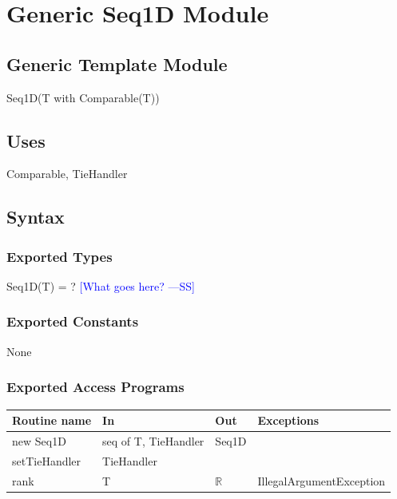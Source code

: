 \documentclass[12pt,fleqn]{examtst}
\newcommand{\authornote}[3]{\textcolor{#1}{[#3 ---#2]}}
\newcommand{\authornote}[3]{}
\newcommand{\wss}[1]{\authornote{blue}{SS}{#1}}
\begin{document}

\newpage

\section* {Generic Seq1D Module}

\subsection* {Generic Template Module}

Seq1D(T with Comparable(T))

\subsection* {Uses}

Comparable, TieHandler

\subsection* {Syntax}

\subsubsection* {Exported Types}

Seq1D(T) = ?
\wss{What goes here?}

\subsubsection* {Exported Constants}

None

\subsubsection* {Exported Access Programs}

\begin{tabular}{| l | l | l | p{6cm} |}
\hline
\textbf{Routine name} & \textbf{In} & \textbf{Out} & \textbf{Exceptions}\\
\hline
new Seq1D & seq of T, TieHandler & Seq1D & \\
\hline
setTieHandler & TieHandler &  & \\
\hline
rank & T & $\mathbb{R}$ & IllegalArgumentException\\
\hline

\end{tabular}
\end{document}
